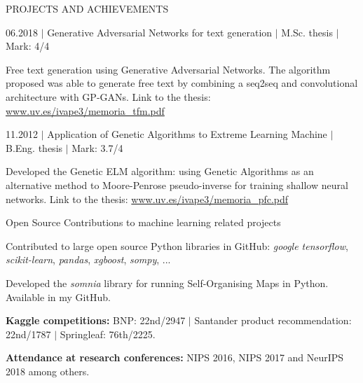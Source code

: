 \documentclass{resume} %
\begin{document}

\begin{rSection}{PROJECTS AND ACHIEVEMENTS}

\begin{rSubsection}{06.2018 $|$ Generative Adversarial Networks for text generation  $|$  \textnormal{M.Sc. thesis  $|$  Mark: 4/4}}{}{}{}  %

\vspace{-3pt}

\item Free text generation using Generative Adversarial Networks. The algorithm proposed was able to generate free text by combining a seq2seq and convolutional architecture with GP-GANs. Link to the thesis: \href{https://www.uv.es/ivape3/memoria_tfm.pdf}{www.uv.es/ivape3/memoria\_tfm.pdf}

\end{rSubsection}

\vspace{-6pt}

\begin{rSubsection}{11.2012 $|$ Application of Genetic Algorithms to Extreme Learning Machine  $|$  \textnormal{B.Eng. thesis  $|$  Mark: 3.7/4}}
{}{}{}

\vspace{-3pt}

\item Developed the Genetic ELM algorithm: using Genetic Algorithms as an alternative method to Moore-Penrose pseudo-inverse for training shallow neural networks. Link to the thesis: \href{https://www.uv.es/ivape3/memoria_pfc.pdf}{www.uv.es/ivape3/memoria\_pfc.pdf}

\end{rSubsection}

\vspace{-6pt}

\begin{rSubsection}{Open Source Contributions to machine learning related projects}
	{}{}{}

	\vspace{-3pt}

	\item Contributed to large open source Python libraries in GitHub: \textit{google tensorflow}, \textit{scikit-learn}, \textit{pandas}, \textit{xgboost}, \textit{sompy}, ...
	\item Developed the \textit{somnia} library for running Self-Organising Maps in Python. Available in my GitHub.
\end{rSubsection}

\vspace{-6pt}

\textbf{Kaggle competitions:} BNP: 22nd/2947 $|$ Santander product recommendation: 22nd/1787 $|$ Springleaf: 76th/2225.

\vspace{-6pt}

\textbf{Attendance at research conferences:} NIPS 2016, NIPS 2017 and NeurIPS 2018 among others.


\end{rSection}
\end{document}
